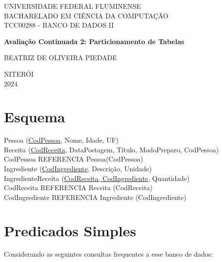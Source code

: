\documentclass[12pt,a4paper]{article}
\begin{document}
	
\begin{titlepage}
	\centering
	\vspace{2cm}
	
	{UNIVERSIDADE FEDERAL FLUMINENSE} \\ [0.1cm]
	{BACHARELADO EM CIÊNCIA DA COMPUTAÇÃO} \\ [0.1cm]
	{TCC00288 - BANCO DE DADOS II}
	
	\vfill
	
	{\Large \bfseries Avaliação Continuada 2: Particionamento de Tabelas}
	
	\vfill
	
	{BEATRIZ DE OLIVEIRA PIEDADE}
	
	\vfill
	{NITERÓI} \\
	{2024}
\end{titlepage}

\tableofcontents

\newpage
\section{Esquema}

\begin{flushleft}
	Pessoa (\underline{CodPessoa}, Nome, Idade, UF) \\[0.2cm]
	Receita (\underline{CodReceita}, DataPostagem, Título, ModoPreparo, CodPessoa) \\
	\quad \quad \quad \quad CodPessoa REFERENCIA Pessoa(CodPessoa) \\[0.2cm]
	
	Ingrediente (\underline{CodIngrediente}, Descrição, Unidade) \\[0.2cm]
	IngredienteReceita (\underline{CodReceita, CodIngrediente}, Quantidade) \\
	\quad \quad \quad \quad CodReceita REFERENCIA Receita (CodReceita) \\
	\quad \quad \quad \quad CodIngrediente REFERENCIA Ingrediente (CodIngrediente) \\[0.2cm]
\end{flushleft}

\newpage
\section{Predicados Simples}

Considerando as seguintes consultas frequentes a esse banco de dados:
\end{document}
